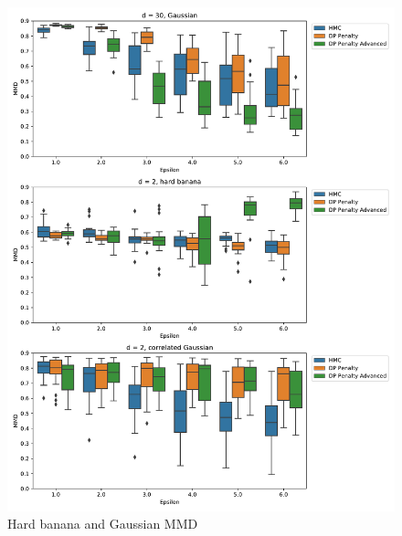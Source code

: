 ﻿\documentclass[a4paper]{article}
\begin{document}
\begin{figure}[h]
  \centering
  \includegraphics[width=\textwidth]{figures/banana_extra}
  \caption{Hard banana and Gaussian MMD}
  \label{banana_extra_mmd_fig}
\end{figure}
\end{document}
